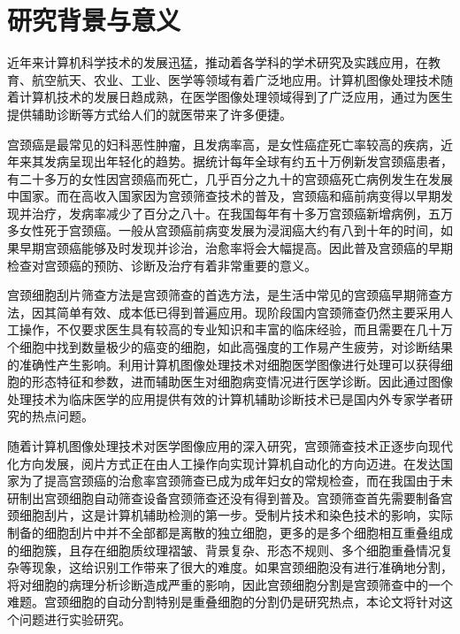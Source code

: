 \documentclass[nomlist,masters]{seuthesix}
\begin{document}
\section{研究背景与意义}
近年来计算机科学技术的发展迅猛，推动着各学科的学术研究及实践应用，在教育、航空航天、农业、工业、医学等领域有着广泛地应用。计算机图像处理技术随着计算机技术的发展日趋成熟，在医学图像处理领域得到了广泛应用，通过为医生提供辅助诊断等方式给人们的就医带来了许多便捷。

宫颈癌是最常见的妇科恶性肿瘤，且发病率高，是女性癌症死亡率较高的疾病，近年来其发病呈现出年轻化的趋势。据统计每年全球有约五十万例新发宫颈癌患者，有二十多万的女性因宫颈癌而死亡，几乎百分之九十的宫颈癌死亡病例发生在发展中国家。而在高收入国家因为宫颈筛查技术的普及，宫颈癌和癌前病变得以早期发现并治疗，发病率减少了百分之八十。在我国每年有十多万宫颈癌新增病例，五万多女性死于宫颈癌。一般从宫颈癌前病变发展为浸润癌大约有八到十年的时间，如果早期宫颈癌能够及时发现并诊治，治愈率将会大幅提高。因此普及宫颈癌的早期检查对宫颈癌的预防、诊断及治疗有着非常重要的意义\cite{Behtash2005Cervical,Kulasingam2006Cost,Kirschner2011Screening,Malm2013Image}。

宫颈细胞刮片筛查方法是宫颈筛查的首选方法，是生活中常见的宫颈癌早期筛查方法\cite{吕琳2011宫颈癌早期筛查方法研究进展}，因其简单有效、成本低已得到普遍应用。现阶段国内宫颈筛查仍然主要采用人工操作，不仅要求医生具有较高的专业知识和丰富的临床经验，而且需要在几十万个细胞中找到数量极少的癌变的细胞，如此高强度的工作易产生疲劳，对诊断结果的准确性产生影响。利用计算机图像处理技术对细胞医学图像进行处理可以获得细胞的形态特征和参数，进而辅助医生对细胞病变情况进行医学诊断。因此通过图像处理技术为临床医学的应用提供有效的计算机辅助诊断技术已是国内外专家学者研究的热点问题。

随着计算机图像处理技术对医学图像应用的深入研究，宫颈筛查技术正逐步向现代化方向发展，阅片方式正在由人工操作向实现计算机自动化的方向迈进。在发达国家为了提高宫颈癌的治愈率宫颈筛查已成为成年妇女的常规检查，而在我国由于未研制出宫颈细胞自动筛查设备宫颈筛查还没有得到普及。宫颈筛查首先需要制备宫颈细胞刮片，这是计算机辅助检测的第一步。受制片技术和染色技术的影响，实际制备的细胞刮片中并不全部都是离散的独立细胞，更多的是多个细胞相互重叠组成的细胞簇，且存在细胞质纹理褶皱、背景复杂、形态不规则、多个细胞重叠情况复杂等现象，这给识别工作带来了很大的难度\cite{吴东东2012宫颈细胞图像分割方法研究,范金坪2010宫颈细胞图像分割和识别方法研究}。如果宫颈细胞没有进行准确地分割，将对细胞的病理分析诊断造成严重的影响，因此宫颈细胞分割是宫颈筛查中的一个难题。宫颈细胞的自动分割特别是重叠细胞的分割仍是研究热点，本论文将针对这个问题进行实验研究。
\end{document}
